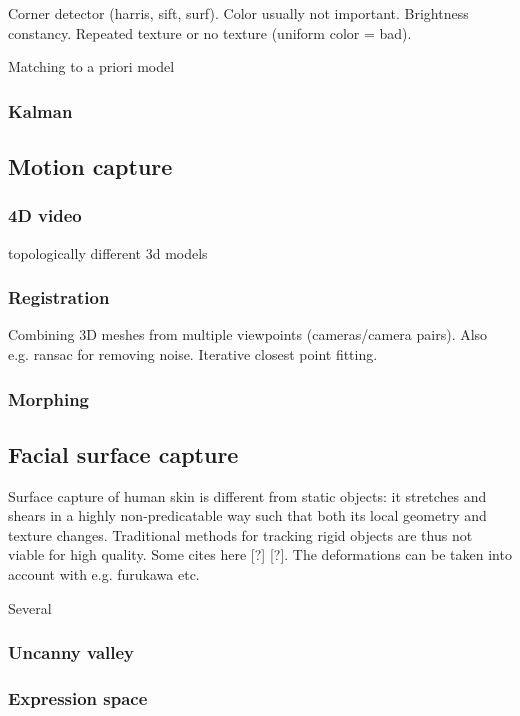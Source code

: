Corner detector (harris, sift, surf). Color usually not important. Brightness constancy. Repeated texture or no texture (uniform color = bad).

Matching to a priori model

\subsubsection{Kalman}

\subsection{Motion capture}

\subsubsection{4D video}

topologically different 3d models

\subsubsection{Registration}

Combining 3D meshes from multiple viewpoints (cameras/camera pairs). Also e.g. ransac for removing noise. Iterative closest point fitting.


\subsubsection{Morphing}


\subsection{Facial surface capture}

Surface capture of human skin is different from static objects: it stretches and shears in a highly non-predicatable way such that both its local geometry and texture changes.
Traditional methods for tracking rigid objects are thus not viable for high quality.
Some cites here [?] [?]. The deformations can be taken into account with e.g. furukawa etc.

Several 

\subsubsection{Uncanny valley}

\subsubsection{Expression space}

